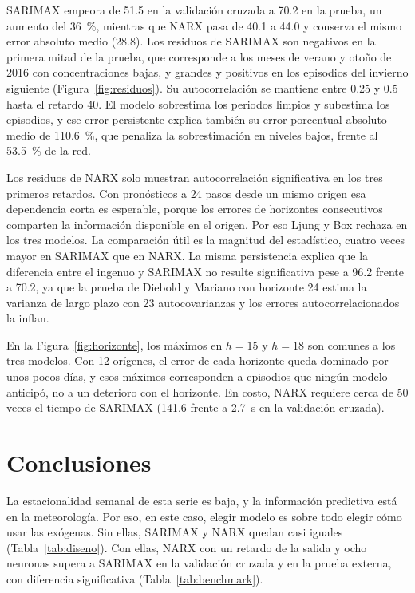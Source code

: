 \documentclass[11pt,letterpaper]{article}
\begin{document}
SARIMAX empeora de 51.5 en la validación cruzada a 70.2 en la prueba, un aumento del 36~\%, mientras que NARX pasa de 40.1 a 44.0 y conserva el mismo error absoluto medio (28.8). Los residuos de SARIMAX son negativos en la primera mitad de la prueba, que corresponde a los meses de verano y otoño de 2016 con concentraciones bajas, y grandes y positivos en los episodios del invierno siguiente (Figura~\ref{fig:residuos}). Su autocorrelación se mantiene entre 0.25 y 0.5 hasta el retardo 40. El modelo sobrestima los periodos limpios y subestima los episodios, y ese error persistente explica también su error porcentual absoluto medio de 110.6~\%, que penaliza la sobrestimación en niveles bajos, frente al 53.5~\% de la red.

Los residuos de NARX solo muestran autocorrelación significativa en los tres primeros retardos. Con pronósticos a 24 pasos desde un mismo origen esa dependencia corta es esperable, porque los errores de horizontes consecutivos comparten la información disponible en el origen. Por eso Ljung y Box rechaza en los tres modelos. La comparación útil es la magnitud del estadístico, cuatro veces mayor en SARIMAX que en NARX. La misma persistencia explica que la diferencia entre el ingenuo y SARIMAX no resulte significativa pese a 96.2 frente a 70.2, ya que la prueba de Diebold y Mariano con horizonte 24 estima la varianza de largo plazo con 23 autocovarianzas y los errores autocorrelacionados la inflan.

En la Figura~\ref{fig:horizonte}, los máximos en $h=15$ y $h=18$ son comunes a los tres modelos. Con 12 orígenes, el error de cada horizonte queda dominado por unos pocos días, y esos máximos corresponden a episodios que ningún modelo anticipó, no a un deterioro con el horizonte. En costo, NARX requiere cerca de 50 veces el tiempo de SARIMAX (141.6 frente a 2.7~s en la validación cruzada).

\section{Conclusiones}

La estacionalidad semanal de esta serie es baja, y la información predictiva está en la meteorología. Por eso, en este caso, elegir modelo es sobre todo elegir cómo usar las exógenas. Sin ellas, SARIMAX y NARX quedan casi iguales (Tabla~\ref{tab:diseno}). Con ellas, NARX con un retardo de la salida y ocho neuronas supera a SARIMAX en la validación cruzada y en la prueba externa, con diferencia significativa (Tabla~\ref{tab:benchmark}).
\end{document}
